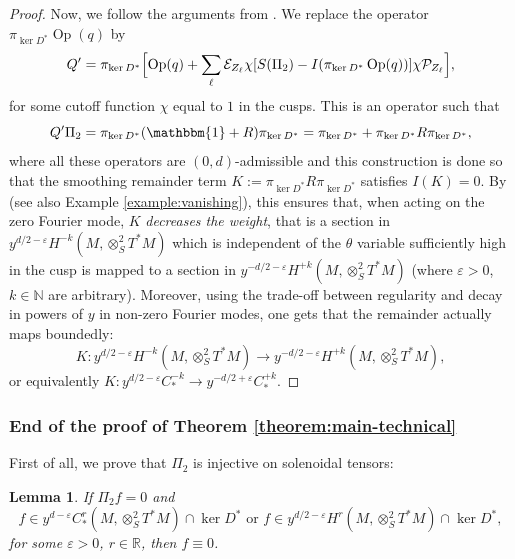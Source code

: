 \documentclass[JEP,XML,SOM,Unicode,NoFloatCountersInSection]{cedram}
\newcommand{\R}{\mathbb{R}}
\newcommand{\N}{\mathbb{N}}
\newcommand{\eps}{\varepsilon}
\DeclareMathOperator{\Op}{Op}
\theoremstyle{plain}
\newtheorem{lemma}{Lemma}[section]
\theoremstyle{definition}
\begin{document}
\begin{proof}
Now, we follow the arguments from \cite[\S 4.2.3]{Bonthonneau-Lefeuvre-19-1}. We replace the operator $\pi_{\ker D^\ast} \Op(q)$ by
\[
Q' = \pi_{\ker D^\ast}\Bigl[ \Op(q) + \sum_\ell \mathcal{E}_{Z_\ell} \chi [ S(\Pi_2) - I(\pi_{\ker D^\ast} \Op(q))] \chi \mathcal{P}_{Z_\ell} \Bigr],
\]
for some cutoff function $\chi$ equal to $1$ in the cusps. This is an operator such that
\[
Q'\Pi_2 = \pi_{\ker D^*}(\mathbbm{1} + R)\pi_{\ker D^*} = \pi_{\ker D^*} + \pi_{\ker D^*}R\pi_{\ker D^*},
\]
where all these operators are $(0,d)$-admissible and this construction is done so that the smoothing remainder term $K:= \pi_{\ker D^*}R\pi_{\ker D^*}$ satisfies $I(K) = 0$. By \cite[Lem.\,4.10]{Bonthonneau-Lefeuvre-19-1} (see also Example \ref{example:vanishing}), this ensures that, when acting on the zero Fourier mode, $K$ \emph{decreases the weight}, that is a section in $y^{d/2-\eps} H^{-k}(M,\otimes^2_S T^*M)$ which is independent of the $\theta$ variable sufficiently high in the cusp is mapped to a section in $y^{-d/2-\eps} H^{+k}(M,\otimes^2_S T^*M)$ (where $\eps > 0$, $k \in \N$ are arbitrary). Moreover, using the trade-off \cite[Lem.\,4.3]{Bonthonneau-Lefeuvre-19-1} between regularity and decay in powers of $y$ in non-zero Fourier modes, one gets that the remainder actually maps boundedly:
\[
K : y^{d/2-\eps} H^{-k}(M,\otimes^2_S T^*M) \to y^{-d/2-\eps} H^{+k}(M,\otimes^2_S T^*M),
\]
or equivalently $K : y^{d/2-\eps} C^{-k}_* \to y^{-d/2+\eps} C^{+k}_*$.
\end{proof}

\subsubsection{End of the proof of Theorem \ref{theorem:main-technical}}

First of all, we prove that $\Pi_2$ is injective on solenoidal tensors:

\begin{lemma}
If $\Pi_2 f = 0$ and
\[
f \in y^{d-\eps} C^r_*(M,\otimes^2_S T^*M) \cap \ker D^* \text{ or } f \in y^{d/2-\eps} H^r(M,\otimes^2_S T^*M) \cap \ker D^*,
\]
for some $\eps > 0$, $r \in \R$, then $f \equiv 0$.
\end{lemma}
\end{document}

